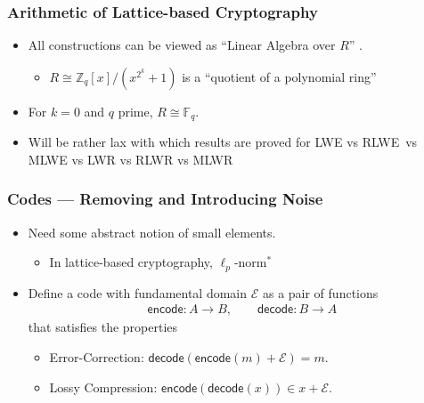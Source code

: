 \documentclass{beamer}
\newcommand{\encode}{\mathsf{encode}}
\newcommand{\decode}{\mathsf{decode}}
\theoremstyle{definition}
\begin{document}
\begin{frame}
	\frametitle{Arithmetic of Lattice-based Cryptography}
\begin{itemize}
\item All constructions can be viewed as ``\alert{Linear Algebra} over $R$'' \cite{cryptofromlinalg}.\pause
\begin{itemize}
	\item $R\cong \mathbb{Z}_q[x] / (x^{2^k}+1)$ is a ``quotient of a polynomial ring''\pause
\end{itemize}
\item For $k = 0$ and $q$ prime, $R\cong\mathbb{F}_q$.\pause
\item Will be rather lax with which results are proved for LWE vs RLWE\pause\ vs MLWE vs LWR vs RLWR vs MLWR
\end{itemize}

\end{frame}


\begin{frame}
	\frametitle{Codes --- Removing and Introducing Noise}
	\begin{itemize}
	\item Need some abstract notion of \alert{small} elements.\pause
	\begin{itemize}
		\item In lattice-based cryptography, $\ell_p$-norm\pause ${}^*$\pause
	\end{itemize}
	\item Define a \alert{code} with \alert{fundamental domain} $\mathcal{E}$ as a pair of functions\pause
	\begin{align*}
	\encode: A \to B,\qquad \decode : B\to A
	\end{align*}
	that satisfies the properties\pause
	\begin{itemize}
		\item \alert{Error-Correction}: $\decode(\encode(m) + \mathcal{E}) = m$.\pause
		\item \alert{Lossy Compression}: $\encode(\decode(x)) \in x + \mathcal{E}$.
	\end{itemize}
	\end{itemize}
\end{frame}
\end{document}
